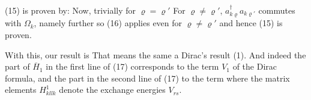 \begin{paper}{1}
(15) is proven by:
Now, trivially for $\varrho=\varrho'$
For $\varrho\neq\varrho'$, $a_{k\varrho}^\dagger a_{k\varrho'}$ commutes with $\Omega_k$, namely
further
so (16) applies even for $\varrho\neq\varrho'$ and hence (15) is proven.

With this, our result is
That means the same a Dirac's result (1). And indeed the part of $\overline{H}_1$ in the first line of (17) corresponds to the term $V_1$ of the Dirac formula, and the part in the second line of (17) to the term
where the matrix elements $H_{kllk}^1$ denote the exchange energies $V_{rs}$.
\end{paper}